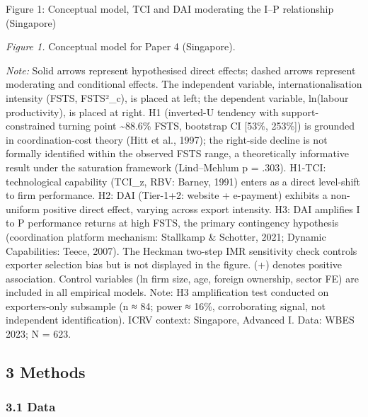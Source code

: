 \documentclass[
  12pt,a4paper]{article}
\begin{document}
Figure 1: Conceptual model, TCI and DAI moderating the I--P relationship
(Singapore)

\emph{Figure 1.} Conceptual model for Paper 4 (Singapore).

\emph{Note:} Solid arrows represent hypothesised direct effects; dashed
arrows represent moderating and conditional effects. The independent
variable, internationalisation intensity (FSTS, FSTS²\_c), is placed at
left; the dependent variable, ln(labour productivity), is placed at
right. H1 (inverted-U tendency with support-constrained turning point
\textasciitilde88.6\% FSTS, bootstrap CI {[}53\%, 253\%{]}) is grounded
in coordination-cost theory (Hitt et al., 1997); the right-side decline
is not formally identified within the observed FSTS range, a
theoretically informative result under the saturation framework
(Lind--Mehlum p = .303). H1-TCI: technological capability (TCI\_z, RBV:
Barney, 1991) enters as a direct level-shift to firm performance. H2:
DAI (Tier-1+2: website + e-payment) exhibits a non-uniform positive
direct effect, varying across export intensity. H3: DAI amplifies I to P
performance returns at high FSTS, the primary contingency hypothesis
(coordination platform mechanism: Stallkamp \& Schotter, 2021; Dynamic
Capabilities: Teece, 2007). The Heckman two-step IMR sensitivity check
controls exporter selection bias but is not displayed in the figure. (+)
denotes positive association. Control variables (ln firm size, age,
foreign ownership, sector FE) are included in all empirical models.
Note: H3 amplification test conducted on exporters-only subsample (n ≈
84; power ≈ 16\%, corroborating signal, not independent identification).
ICRV context: Singapore, Advanced I. Data: WBES 2023; N = 623.

\hypertarget{methods}{%
\subsection{3 Methods}\label{methods}}

\hypertarget{data}{%
\subsubsection{3.1 Data}\label{data}}
\end{document}
